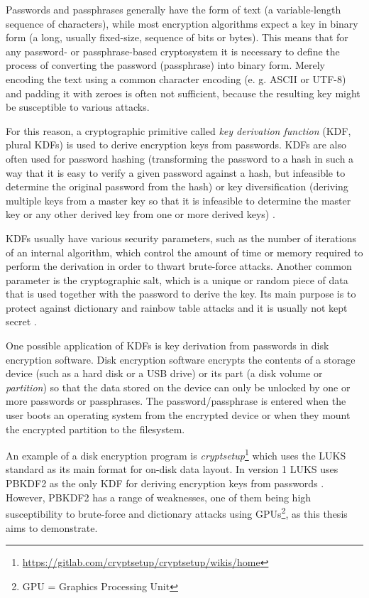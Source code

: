 \documentclass[12pt,oneside]{fithesis2}
\begin{document}
      Passwords and passphrases generally have the form of text (a variable-length sequence of characters), while most encryption algorithms expect a key in binary form (a long, usually fixed-size, sequence of bits or bytes). This means that for any password- or pass\-phrase-based cryptosystem it is necessary to define the process of converting the password (passphrase) into binary form. Merely encoding the text using a common character encoding (e. g. ASCII or UTF-8) and padding it with zeroes is often not sufficient, because the resulting key might be susceptible to various attacks.
    
      For this reason, a cryptographic primitive called \emph{key derivation function} (KDF, plural KDFs) is used to derive encryption keys from passwords. KDFs are also often used for password hashing (transforming the password to a hash in such a way that it is easy to verify a given password against a hash, but infeasible to determine the original password from the hash) or key diversification (deriving multiple keys from a master key so that it is infeasible to determine the master key or any other derived key from one or more derived keys) \cite{wikiKDF, nist:sp800:108}.
    
      KDFs usually have various security parameters, such as the number of iterations of an internal algorithm, which control the amount of time or memory required to perform the derivation in order to thwart brute-force attacks. Another common parameter is the cryptographic salt, which is a unique or random piece of data that is used together with the password to derive the key. Its main purpose is to protect against dictionary and rainbow table attacks and it is usually not kept secret \cite{rfc2898}.
      
      \sloppy
      One possible application of KDFs is key derivation from passwords in disk encryption software. Disk encryption software encrypts the contents of a storage device (such as a hard disk or a USB drive) or its part (a disk volume or \emph{partition}) so that the data stored on the device can only be unlocked by one or more passwords or passphrases. The password/passphrase is entered when the user boots an operating system from the encrypted device or when they mount the encrypted partition to the filesystem.
      
      An example of a disk encryption program is \emph{cryptsetup}\footnote{\url{https://gitlab.com/cryptsetup/cryptsetup/wikis/home}} which uses the LUKS standard as its main format for on-disk data layout. In version 1 LUKS uses PBKDF2 as the only KDF for deriving encryption keys from passwords \cite{luks}. However, PBKDF2 has a range of weaknesses, one of them being high susceptibility to brute-force and dictionary attacks using GPUs\footnote{GPU = Graphics Processing Unit}, as this thesis aims to demonstrate.
    
\end{document}
